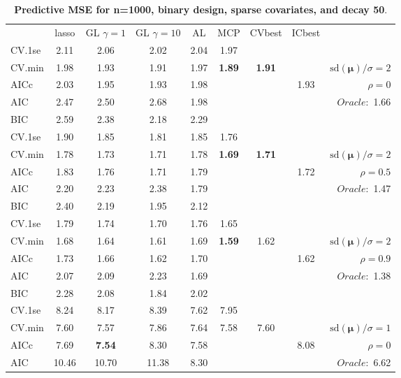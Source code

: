 \begin{table}\vspace{-.5cm}
\caption[l]{ { \bf Predictive MSE for n=1000, binary design, 
sparse covariates, and  decay  50}.}
\vspace{-.5cm}
\footnotesize{}
\begin{center}
\begin{tabular}{l*{7}{c}|r}
 & lasso & GL $\gamma=1$ & GL $\gamma=10$ & AL & MCP  & CVbest & ICbest  \\
\cline{1-9}
CV.1se & 2.11 & 2.06 & 2.02 & 2.04 & 1.97 & & & \\
CV.min & 1.98 & 1.93 & 1.91 & 1.97 & {\bf 1.89} & {\bf 1.91} & & $\mathrm{sd}(\mathbf{\mu})/\sigma=2$ \\
AICc & 2.03 & 1.95 & 1.93 & 1.98 & & & 1.93 &  $\rho=0$ \\
AIC & 2.47 & 2.50 & 2.68 & 1.98 & & & &  \multirow{2}{*}{$Oracle: $ 1.66} \\
BIC & 2.59 & 2.38 & 2.18 & 2.29 & & & &  \\
 \hline 
CV.1se & 1.90 & 1.85 & 1.81 & 1.85 & 1.76 & & & \\
CV.min & 1.78 & 1.73 & 1.71 & 1.78 & {\bf 1.69} & {\bf 1.71} & & $\mathrm{sd}(\mathbf{\mu})/\sigma=2$ \\
AICc & 1.83 & 1.76 & 1.71 & 1.79 & & & 1.72 &  $\rho=0.5$ \\
AIC & 2.20 & 2.23 & 2.38 & 1.79 & & & &  \multirow{2}{*}{$Oracle: $ 1.47} \\
BIC & 2.40 & 2.19 & 1.95 & 2.12 & & & &  \\
 \hline 
CV.1se & 1.79 & 1.74 & 1.70 & 1.76 & 1.65 & & & \\
CV.min & 1.68 & 1.64 & 1.61 & 1.69 & {\bf 1.59} & 1.62 & & $\mathrm{sd}(\mathbf{\mu})/\sigma=2$ \\
AICc & 1.73 & 1.66 & 1.62 & 1.70 & & & 1.62 &  $\rho=0.9$ \\
AIC & 2.07 & 2.09 & 2.23 & 1.69 & & & &  \multirow{2}{*}{$Oracle: $ 1.38} \\
BIC & 2.28 & 2.08 & 1.84 & 2.02 & & & &  \\
 \hline 
CV.1se & 8.24 & 8.17 & 8.39 & 7.62 & 7.95 & & & \\
CV.min & 7.60 & 7.57 & 7.86 & 7.64 & 7.58 & 7.60 & & $\mathrm{sd}(\mathbf{\mu})/\sigma=1$ \\
AICc & 7.69 & {\bf 7.54} & 8.30 & 7.58 & & & 8.08 &  $\rho=0$ \\
AIC & 10.46 & 10.70 & 11.38 & 8.30 & & & &  \multirow{2}{*}{$Oracle: $ 6.62} \\

\end{tabular}
\end{center}
\end{table}
